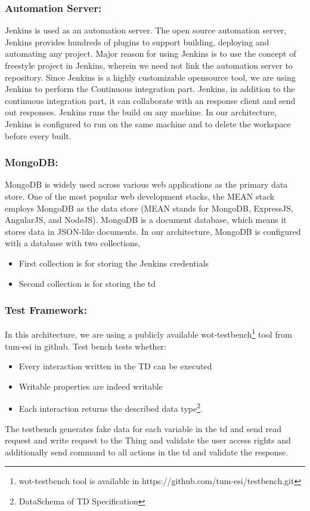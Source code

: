 \documentclass[conference]{IEEEtran}
\theoremstyle{definition}
\begin{document}
\subsubsection{Automation Server:}

Jenkins is used as an automation server. 
The open source automation server, Jenkins provides hundreds of plugins to support building, deploying and automating any project. 
Major reason for using Jenkins is to use the concept of freestyle project in Jenkins, wherein we need not link the automation server to repository. 
Since Jenkins is a highly customizable opensource tool, we are using Jenkins to perform the Continuous integration part.  
Jenkins, in addition to the continuous integration part, it can collaborate with an response client and send out responses. 
Jenkins runs the build on any machine. 
In our architecture, Jenkins is configured to run on the same machine and to delete the workspace before every built.

\subsubsection{MongoDB:}

MongoDB is widely used across various web applications as the primary data store. 
One of the most popular web development stacks, the MEAN stack employs MongoDB as the data store (MEAN stands for MongoDB, ExpressJS, AngularJS, and NodeJS). 
MongoDB is a document database, which means it stores data in JSON-like documents. 
In our architecture, MongoDB is configured with a database with two collections, 

\begin{itemize}
  \item First collection is for storing the Jenkins credentials
  \item Second collection is for storing the \ac{td}
\end{itemize}

\subsubsection{Test Framework: }

In this architecture, we are using a publicly available wot-testbench\footnote{wot-testbench tool is available in https://github.com/tum-esi/testbench.git} tool from tum-esi in github.  
Test bench tests whether: 
\begin{itemize}
\item Every interaction written in the TD can be executed
\item Writable properties are indeed writable
\item Each interaction returns the described data type\footnote{DataSchema of TD Specification}. 
\end{itemize}
The testbench generates fake data for each variable in the \ac{td} and send read request and write request to the Thing and validate the user access rights and additionally send command to all actions in the \ac{td} and validate the response.
\end{document}
